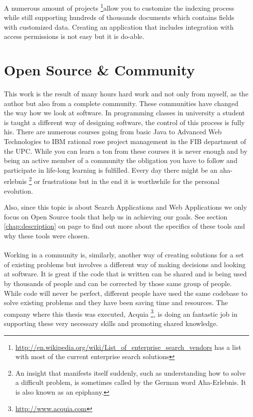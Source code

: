 A numerous amount of projects \footnote{\url{http://en.wikipedia.org/wiki/List_of_enterprise_search_vendors} has a list with most of the current enterprise search solutions}allow you to customize the indexing process while still supporting hundreds of thousands \glspl{document} which contains \glspl{field} with customized data. Creating an application that includes integration with access permissions is not easy but it is do-able.

\section{Open Source \& Community}
\paragraph{}
This work is the result of many hours hard work and not only from myself, as the author but also from a complete community. These communities have changed the way how we look at software. In programming classes in university a student is taught a different way of designing software, the control of this process is fully his. There are numerous courses going from basic Java to Advanced Web Technologies to IBM rational rose project management in the FIB department of the UPC. While you can learn a ton from these courses it is never enough and by being an active member of a community the obligation you have to follow and participate in life-long learning is fulfilled. Every day there might be an aha-erlebnis \footnote{An insight that manifests itself suddenly, such as understanding how to solve a difficult problem, is sometimes called by the German word Aha-Erlebnis. It is also known as an epiphany.} or frustrations but in the end it is worthwhile for the personal evolution. 

Also, since this topic is about Search Applications and Web Applications we only focus on Open Source tools that help us in achieving our goals. See section \ref{chap:description} on page \pageref{chap:description} to find out more about the specifics of these tools and why these tools were chosen. 

\paragraph{}
Working in a community is, similarly, another way of creating solutions for a set of existing problems but involves a different way of making decisions and looking at software. It is great if the code that is written can be shared and is being used by thousands of people and can be corrected by those same group of people. While code will never be perfect, different people have used the same codebase to solve existing problems and they have been saving time and resources. The company where this thesis was executed, Acquia \footnote{\url{http://www.acquia.com}}, is doing an fantastic job in supporting these very necessary skills and promoting shared knowledge.

